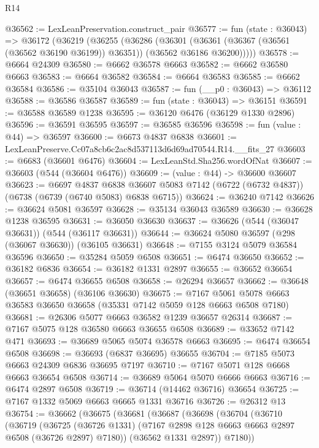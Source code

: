 \begin{lexlean}{R14}
\begin{coremodule}
@36562 := LexLeanPreservation.construct_pair
@36577 := fun (state : @36043) =>
  @36172
    (@36219
      (@36255
        (@36286
          (@36301
            (@36361 (@36367 (@36561 (@36562 @36190 @36199)) @36351))
            (@36562 @36186 @36200)))))
@36578 := @6664 @24309
@36580 := @6662 @36578 @6663
@36582 := @6662 @36580 @6663
@36583 := @6664 @36582
@36584 := @6664 @36583
@36585 := @6662 @36584
@36586 := @35104 @36043
@36587 := fun (__p0 : @36043) => @36112
@36588 := @36586 @36587
@36589 := fun (state : @36043) => @36151
@36591 := @36588 @36589 @1238
@36595 := @36120 @6476 (@36129 @1330 @2896)
@36596 := @36591 @36595
@36597 := @36585 @36596
@36598 := fun (value : @44) => @36597
@36600 := @6673 @4837 @6838
@36601 := LexLeanPreserve.Cc07a8cb6c2ac8d537113d6d69ad70544.R14.__fits_27
@36603 := @6683 (@36601 @6476)
@36604 := LexLeanStd.Sha256.wordOfNat
@36607 := @36603 (@544 (@36604 @6476))
@36609 := (value : @44) -> @36600 @36607
@36623 := @6697
    @4837
    @6838
    @36607
    @5083
    @7142
    (@6722 (@6732 @4837))
    (@6738 (@6739 (@6740 @5083) @6838 @6715))
@36624 := @36240 @7142
@36626 := @36624 @5081 @36597
@36628 := @35134 @36043 @36589
@36630 := @36628 @1238 @36595
@36631 := @36050 @36630
@36637 := @36626 (@544 (@36047 @36631)) (@544 (@36117 @36631))
@36644 := @36624 @5080 @36597 (@298 (@36067 @36630)) (@36105 @36631)
@36648 := @7155 @3124 @5079 @36584 @36596
@36650 := @35284 @5059 @6508
@36651 := @6474 @36650
@36652 := @36182 @6836
@36654 := @36182 @1331 @2897
@36655 := @36652 @36654
@36657 := @6474 @36655 @6508
@36658 := @26294 @36657
@36662 := @36648 (@36651 @36658) (@36106 @36630)
@36675 := @7167 @5061 @5078 @6663 @36583 @36650 @36658 (@35331 @7142 @5059 @128 @6663 @6508 @7180)
@36681 := @26306 @5077 @6663 @36582 @1239 @36657 @26314
@36687 := @7167 @5075 @128 @36580 @6663 @36655 @6508
@36689 := @33652 @7142 @471
@36693 := @36689 @5065 @5074 @36578 @6663
@36695 := @6474 @36654 @6508
@36698 := @36693 (@6837 @36695) @36655
@36704 := @7185 @5073 @6663 @24309 @6836 @36695 @7197
@36710 := @7167 @5071 @128 @6668 @6663 @36654 @6508
@36714 := @36689 @5064 @5070 @6666 @6663
@36716 := @6474 @2897 @6508
@36719 := @36714 (@14462 @36716) @36654
@36725 := @7167 @1332 @5069 @6663 @6665 @1331 @36716
@36726 := @26312 @13
@36754 := @36662
    (@36675
      (@36681
        (@36687
          (@36698
            (@36704
              (@36710
                (@36719
                  (@36725
                    (@36726 @1331)
                    (@7167 @2898 @128 @6663 @6663 @2897 @6508 (@36726 @2897) @7180))
                  (@36562 @1331 @2897))
                @7180))

\end{coremodule}
\end{lexlean}
